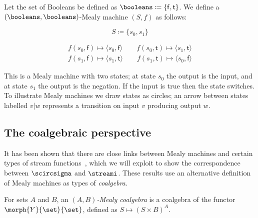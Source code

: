 \documentclass{lmcs}
\begin{document}
\begin{exa}\label{ex:mealy}
    Let the set of Booleans be defined as
    \(\booleans \coloneqq \{\mathsf{f},\mathsf{t}\}\).
    We define a \((\booleans,\booleans)\)-Mealy machine \((S, f)\) as follows:
    \begin{center}
        \begin{minipage}{0.33\textwidth}
            \[S \coloneqq \{s_0, s_1\}\]
        \end{minipage}
        \begin{minipage}{0.66\textwidth}
            \begin{gather*}
                f(s_0, \mathsf{f}) \mapsto \langle{s_0, \mathsf{f}}\rangle
                \qquad
                f(s_0, \mathsf{t}) \mapsto \langle{s_1, \mathsf{t}}\rangle
                \\
                f(s_1, \mathsf{f}) \mapsto \langle{s_1, \mathsf{t}}\rangle
                \qquad
                f(s_1, \mathsf{t}) \mapsto \langle{s_0, \mathsf{f}}\rangle
            \end{gather*}
        \end{minipage}
    \end{center}
    This is a Mealy machine with two states; at state \(s_0\) the output is the
    input, and at state \(s_1\) the output is the negation.
    If the input is true then the state switches.
    To illustrate Mealy machines we draw states as circles; an arrow between
    states labelled \(v|w\) represents a transition on input \(v\) producing
    output \(w\).
    \begin{center}
        
    \end{center}
\end{exa}

\subsection{The coalgebraic perspective}

It has been shown that there are close links between Mealy machines and certain
types of stream
functions~\cite{rutten2006algebraic,bonsangue2008coalgebraic}, which we will
exploit to show the correspondence between \(\scircsigma\) and \(\streami\).
These results use an alternative definition of Mealy machines as types of
\emph{coalgebra}.

\begin{defi}
    For sets \(A\) and \(B\), an \emph{\((A,B)\)-Mealy coalgebra} is a coalgebra
    of the functor \(\morph{Y}{\set}{\set}\), defined as
    \(S \mapsto (S \times B)^A\).
\end{defi}
\end{document}
